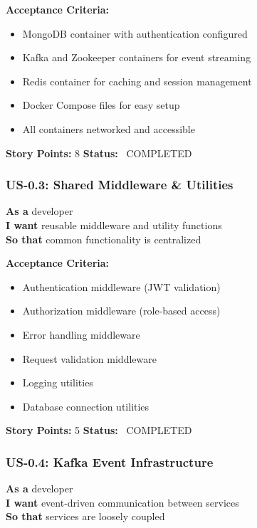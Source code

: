 \documentclass[11pt,a4paper]{article}
\begin{document}
\textbf{Acceptance Criteria:}
\begin{itemize}[label=\textcolor{successgreen}{\faCheck}]
    \item MongoDB container with authentication configured
    \item Kafka and Zookeeper containers for event streaming
    \item Redis container for caching and session management
    \item Docker Compose files for easy setup
    \item All containers networked and accessible
\end{itemize}

\textbf{Story Points:} 8 \hfill \textbf{Status:} \textcolor{successgreen}{\faCheckCircle\ COMPLETED}

\vspace{0.5cm}

\subsubsection{US-0.3: Shared Middleware \& Utilities}
\begin{tcolorbox}[colback=white,colframe=primaryblue]
\textbf{As a} developer\\
\textbf{I want} reusable middleware and utility functions\\
\textbf{So that} common functionality is centralized
\end{tcolorbox}

\textbf{Acceptance Criteria:}
\begin{itemize}[label=\textcolor{successgreen}{\faCheck}]
    \item Authentication middleware (JWT validation)
    \item Authorization middleware (role-based access)
    \item Error handling middleware
    \item Request validation middleware
    \item Logging utilities
    \item Database connection utilities
\end{itemize}

\textbf{Story Points:} 5 \hfill \textbf{Status:} \textcolor{successgreen}{\faCheckCircle\ COMPLETED}

\vspace{0.5cm}

\subsubsection{US-0.4: Kafka Event Infrastructure}
\begin{tcolorbox}[colback=white,colframe=primaryblue]
\textbf{As a} developer\\
\textbf{I want} event-driven communication between services\\
\textbf{So that} services are loosely coupled
\end{tcolorbox}
\end{document}
